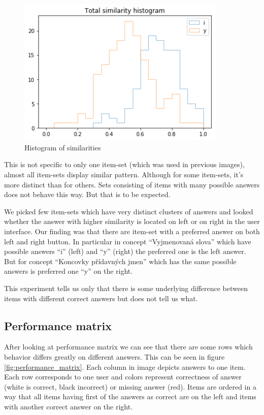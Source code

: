 \documentclass[
  digital, %
  table,   %
  nolof,     %
  nolot,     %
  nocover
]{fithesis3}
\begin{document}
\begin{figure}
  \includegraphics[width=10cm]{img/histogram_i_y}
  \caption{Histogram of similarities}
  \label{fig:histogram_i_y}
\end{figure}



This is not specific to only one item-set (which was used in previous images), almost all item-sets display similar pattern. Although for some item-sets, it's more distinct than for others. Sets consisting of items with many possible answers does not behave this way. But that is to be expected.

We picked few item-sets which have very distinct clusters of answers and looked whether the answer with higher similarity is located on left or on right in the user interface. Our finding was that there are item-set with a preferred answer on both left and right button. In particular in concept ``Vyjmenovaná slova'' which have possible answers ``i'' (left) and ``y'' (right) the preferred one is the left answer. But for concept ``Koncovky přídavných jmen'' which has the same possible answers is preferred one ``y'' on the right.

This experiment tells us only that there is some underlying difference between items with different correct answers but does not tell us what.


\subsection{Performance matrix}\label{performance-matrix}

After looking at performance matrix we can see that there are some rows which behavior differs greatly on different answers. This can be seen in figure \ref{fig:performance_matrix}. Each column in image depicts answers to one item. Each row corresponds to one user and colors represent correctness of answer (white is correct, black incorrect) or missing answer (red). Items are ordered in a way that all items having first of the answers as correct are on the left and items with another correct answer on the right.
\end{document}
